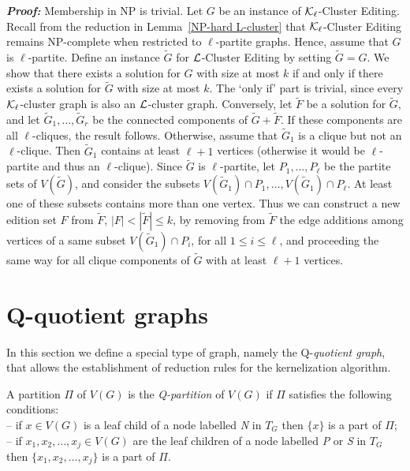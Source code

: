 \documentclass[12pt]{article}
\def\qed{ \fbox \par \medskip }
\def\qed2{ \hfill \framebox[.09in] \par \bigskip }
\def\L{{\cal L}}
\def\KL{{\cal K}_{\ell}}
\begin{document}
\emph{\textbf{Proof:}} Membership in NP is trivial. Let $G$ be an instance of $\KL${\sc -Cluster Editing}.
Recall from the reduction in Lemma~\ref{NP-hard L-cluster} that $\KL${\sc -Cluster Editing} remains NP-complete when restricted to $\ell$-partite graphs.
Hence, assume that $G$ is $\ell$-partite. Define an instance $\widetilde{G}$ for $\L${\sc -Cluster Editing} by setting $\widetilde{G}=G$. We show that there exists a solution for $G$ with size at most $k$ if and only if there exists a solution for $\widetilde{G}$ with size at most $k$. The `only if' part is trivial, since every $\KL$-cluster graph is also an $\L$-cluster graph.
Conversely, let $\widetilde{F}$ be a solution for $\widetilde{G}$, and let $\widetilde{G}_1, \ldots, \widetilde{G}_r$ be the connected components of $\widetilde{G}+\widetilde{F}$.
If these components are all $\ell$-cliques, the result follows. Otherwise, assume that $\widetilde{G}_1$ is a clique but not an $\ell$-clique.
Then $\widetilde{G}_1$ contains at least $\ell+1$ vertices (otherwise it would be $\ell$-partite and thus an $\ell$-clique). Since $\widetilde{G}$ is $\ell$-partite, let $P_1, \ldots, P_\ell$ be the partite sets of $V(\widetilde{G})$,
and consider the subsets $V(\widetilde{G}_1) \cap P_1, \ldots, V(\widetilde{G}_1)\cap P_\ell$.
At least one of these subsets contains more than one vertex. Thus we can construct a new edition set $F$ from $\widetilde{F}$, $|F| < |\widetilde{F}| \leq k$,
by removing from $\widetilde{F}$ the edge additions among vertices of a same subset $V(\widetilde{G}_1) \cap P_i$, for all $1 \leq i \leq \ell$,
and proceeding the same way for all clique components of $\widetilde{G}$ with at least $\ell+1$ vertices. \qed2


\section{Q-quotient graphs}\label{sec3}

In this section we define a special type of graph, namely the Q-\emph{quotient graph}, that allows the establishment of reduction rules for the kernelization algorithm.


\begin{defin}
A partition $\Pi$ of $V(G)$ is the \emph{Q-partition} of $V(G)$ if $\Pi$ satisfies the following conditions:\\
-- if $x \in V(G)$ is a leaf child of a node labelled \emph{N} in $T_G$ then $\{x\}$ is a part of $\Pi$;\\
-- if $x_1, x_2, \ldots, x_j \in V(G)$ are the leaf children of a node labelled \emph{P} or \emph{S} in $T_G$ then $\{x_1, x_2, \ldots, x_j\}$ is a part of $\Pi$.
\end{defin}
\end{document}
